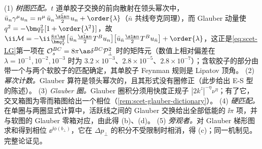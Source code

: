 \begin{proofsketch}
(1) \emph{树图匹配。}$t$ 道单胶子交换的前向散射在领头幂次中，$\bar u_n\gamma^\mu u_n=n^\mu\,\bar u_n\frac{\bar{\sla n}}{2}u_n+\order{\lambda}$（$\bar n$ 共线夸克同理），而 Glauber 动量使 $q^2=-\bm q_{\mathrm T}^2[1+\order{\lambda^2}]$，故
$\ii\mathcal M=-\ii\frac{8\pi\as}{\bm q_{\mathrm T}^2}\big[\bar u_n\tfrac{\bar{\sla n}}{2}T^Bu_n\big]\big[\bar u_{\bar n}\tfrac{\sla n}{2}T^Bu_{\bar n}\big]+\order{\lambda}$，这正是\cref{eq:scet-LG}第一项在 $\mathcal O_s^{BC}=8\pi\as\delta^{BC}\mathcal P_\perp^2$ 时的矩阵元（数值上相对偏差在 $\lambda=10^{-1},10^{-2},10^{-3}$ 时为 $3.2\times10^{-3}$、$2.8\times10^{-5}$、$2.8\times10^{-7}$）；含软胶子的部分由带一个与两个软胶子的匹配确定，其单胶子 Feynman 规则是 Lipatov 顶角\cite[第~5.1、6~节]{RothsteinStewart2016}。%
(2) \emph{幂次计数。}Glauber 算符是领头幂次的，且其形式没有圈修正\cite[第~5.3~节]{RothsteinStewart2016}（此步给出 E-S 型的陈述）。
(3) \emph{Glauber 圈。}Glauber 圈积分须用快度正规子 $|2k^z|^{-\eta}\nu^\eta$；有了它，交叉箱图为零而箱图给出一个相位（\cref{rem:scet-glauber-dictionary}）\cite[第~5.2~节]{RothsteinStewart2016}。
(4) \emph{硬匹配。}在单圈与两圈显式计算中，活跃线之间的 Glauber 交换给出全部低能的 $\ii\pi$ 项，并与软图的 Glauber 零箱对应，由此得 (b)、(d)\cite[第~10~节]{RothsteinStewart2016}。
(5) \emph{旁观者。}对 Glauber 梯形图求和得到相位 $\ee^{\ii\phi(b_\perp)}$，它在 $\Delta p_\perp$ 的积分不受限制时相消，得 (c)\cite[式~(9.1)、(9.18)--(9.19)、(11.12)--(11.13)]{RothsteinStewart2016}；同一机制见\cite[式~(14)]{AybatSterman2009}。完整论证见\cite[第~5、9--11~节]{RothsteinStewart2016}。
\end{proofsketch}

